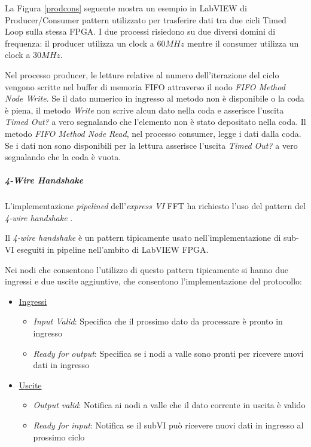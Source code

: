La Figura \ref{prodcons} seguente mostra un esempio in LabVIEW di Producer/Consumer pattern utilizzato per trasferire dati tra due cicli Timed Loop sulla stessa FPGA. I due processi risiedono su due diversi domini di frequenza: il producer utilizza un clock a $60 MHz$ mentre il consumer utilizza un clock a $30 MHz$. 

Nel processo producer, le letture relative al numero dell'iterazione del ciclo vengono scritte nel buffer di memoria FIFO attraverso il nodo \textit{FIFO Method Node Write}. Se il dato numerico in ingresso al metodo non è disponibile o la coda è piena, il metodo \textit{Write} non scrive alcun dato nella coda e asserisce l'uscita \textit{Timed Out?} a vero segnalando che l'elemento non è stato depositato nella coda. Il metodo \textit{FIFO Method Node Read}, nel processo consumer, legge i dati dalla coda. Se i dati non sono disponibili per la lettura asserisce l'uscita \textit{Timed Out?} a vero segnalando che la coda è vuota.

\subparagraph{4-Wire Handshake}
L'implementazione \textit{pipelined} dell'\textit{express VI} FFT ha richiesto l'uso del pattern del \textit{4-wire handshake} \cite{4wirehs}.

Il \textit{4-wire handshake} è un pattern tipicamente usato nell'implementazione di sub-VI eseguiti in pipeline nell'ambito di LabVIEW FPGA.

Nei nodi che consentono l'utilizzo di questo pattern tipicamente si hanno due ingressi e due uscite aggiuntive, che consentono l'implementazione del protocollo:
\begin{itemize}
	\item \underline{Ingressi}
	\begin{itemize}
	\item \textit{Input Valid}: Specifica che il prossimo dato da processare è pronto in ingresso
	\item \textit{Ready for output}: Specifica se i nodi a valle sono pronti per ricevere nuovi dati in ingresso
	\end{itemize}
	\item \underline{Uscite}
	\begin{itemize}
	\item \textit{Output valid}: Notifica ai nodi a valle che il dato corrente in uscita è valido
	\item \textit{Ready for input}: Notifica se il subVI può ricevere nuovi dati in ingresso al prossimo ciclo
	\end{itemize}
\end{itemize}

